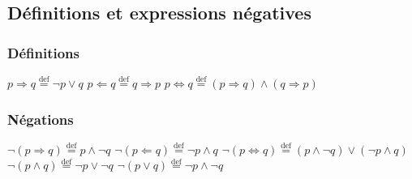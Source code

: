\documentclass[12]{article}%
\theoremstyle{plain}
\theoremstyle{definition}
\theoremstyle{remark}
\begin{document}
\subsection{Définitions et expressions négatives}
\subsubsection{Définitions}
\( p \Rightarrow q \overset{\text{def}}{=} \lnot p \lor q \)
\newline
\newline
\( p \Leftarrow q \overset{\text{def}}{=} q \Rightarrow p \)
\newline
\newline
\(p \Leftrightarrow q \overset{\text{def}}{=} (p \Rightarrow q) \land (q \Rightarrow p) \)

\subsubsection{Négations}
\( \lnot (p \Rightarrow q) \overset{\text{def}}{=} p \land \lnot q \)
\newline
\newline
\( \lnot (p \Leftarrow q) \overset{\text{def}}{=} \lnot p \land q \)
\newline
\newline
\( \lnot (p \Leftrightarrow q) \overset{\text{def}}{=} (p \land \lnot q) \lor (\lnot p \land q) \)
\newline
\newline
\( \lnot (p \land q) \overset{\text{def}}{=} \lnot p \lor \lnot q \)
\newline
\newline
\( \lnot (p \lor q) \overset{\text{def}}{=} \lnot p \land \lnot q \)
\end{document}

